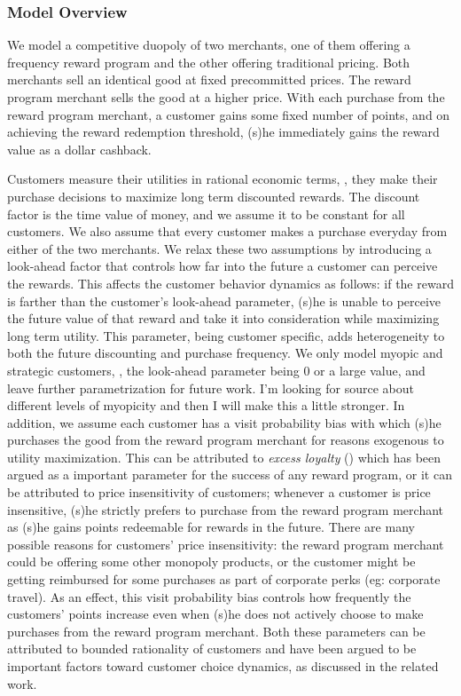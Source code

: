 \subsubsection{Model Overview}
We model a competitive duopoly of two merchants, one of them offering a frequency reward program and the other offering traditional pricing.
Both merchants sell an identical good at fixed precommitted prices.
The reward program merchant sells the good at a higher price.
With each purchase from the reward program merchant, a customer gains some fixed number of points, and on achieving the reward redemption threshold, (s)he immediately gains the reward value as a dollar cashback.

Customers measure their utilities in rational economic terms, \ie, they make their purchase decisions to maximize long term discounted rewards.
The discount factor is the time value of money, and we assume it to be constant for all customers.
We also assume that every customer makes a purchase everyday from either of the two merchants.
We relax these two assumptions by introducing a look-ahead factor that controls how far into the future a customer can perceive the rewards. 
This affects the customer behavior dynamics as follows: if the reward is farther than the customer's look-ahead parameter, (s)he is unable to perceive the future value of that reward and take it into consideration while maximizing long term utility.
This parameter, being customer specific, adds heterogeneity to both the future discounting and purchase frequency.
We only model myopic and strategic customers, \ie, the look-ahead parameter being $0$ or a large value, and leave further parametrization for future work.
{\nolan I'm looking for source about different levels of myopicity and then I will make this a little stronger.}
In addition, we assume each customer has a visit probability bias with which (s)he purchases the good from the reward program merchant for reasons exogenous to utility maximization.
This can be attributed to \emph{excess loyalty} (\cite{fader1993excess, sharp1997loyalty}) which has been argued as a important parameter for the success of any reward program, or it can be attributed to price insensitivity of customers; whenever a customer is price insensitive, (s)he strictly prefers to purchase from the reward program merchant as (s)he gains points redeemable for rewards in the future.
There are many possible reasons for customers' price insensitivity: the reward program merchant could be offering some other monopoly products, or the customer might be getting reimbursed for some purchases as part of corporate perks (eg: corporate travel).
As an effect, this visit probability bias controls how frequently the customers' points increase even when (s)he does not actively choose to make purchases from the reward program merchant.
Both these parameters can be attributed to bounded rationality of customers and have been argued to be important factors toward customer choice dynamics, as discussed in the related work.


